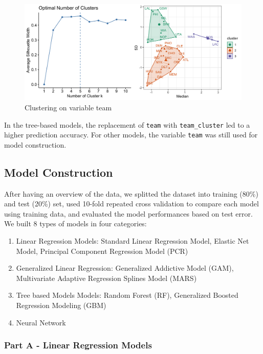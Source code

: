 \documentclass[
]{article}
\begin{document}
\begin{figure}
\centering
\includegraphics{report_figures/figure_tree_1.png}
\caption{Clustering on variable team}
\end{figure}

In the tree-based models, the replacement of \texttt{team} with
\texttt{team\_cluster} led to a higher prediction accuracy. For other
models, the variable \texttt{team} was still used for model
construction.

\hypertarget{model-construction}{%
\subsection{Model Construction}\label{model-construction}}

After having an overview of the data, we splitted the dataset into
training (80\%) and test (20\%) set, used 10-fold repeated cross
validation to compare each model using training data, and evaluated the
model performances based on test error. We built 8 types of models in
four categories:

\begin{enumerate}
\def\labelenumi{\arabic{enumi}.}
\item
  Linear Regression Models: Standard Linear Regression Model, Elastic
  Net Model, Principal Component Regression Model (PCR)
\item
  Generalized Linear Regression: Generalized Addictive Model (GAM),
  Multivariate Adaptive Regression Splines Model (MARS)
\item
  Tree based Models Models: Random Forest (RF), Generalized Boosted
  Regression Modeling (GBM)
\item
  Neural Network
\end{enumerate}

\hypertarget{part-a---linear-regression-models}{%
\subsubsection{Part A - Linear Regression
Models}\label{part-a---linear-regression-models}}
\end{document}
